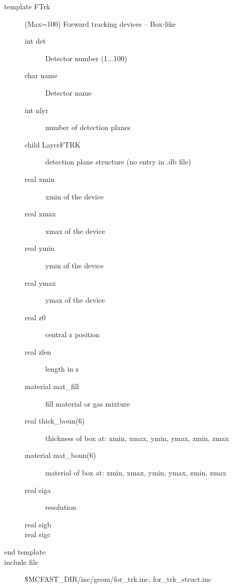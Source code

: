 \begin{description}
\item[{\rm template} FTrk](Max=100)   Forward tracking devices  -- Box-like
\begin{description}
\item[{\rm  int} det]    Detector number (1...100)
\item[{\rm  char} name]  Detector name
\item[{\rm  int} nlyr]   number of detection planes 
\item[{\rm  child} LayerFTRK]  detection plane structure  (no entry in .db file)
\item[{\rm  real} xmin]  xmin of the device
\item[{\rm  real} xmax]  xmax of the device
\item[{\rm  real} ymin]  ymin of the device
\item[{\rm  real} ymax]  ymax of the device
\item[{\rm  real} z0]    central z position
\item[{\rm  real} zlen]  length in z
\item[{\rm  material} mat\_fill]  fill material or gas mixture
\item[{\rm  real} thick\_boun(6)]   thickness of box at: xmin, xmax, ymin, ymax, zmin, zmax
\item[{\rm  material} mat\_boun(6)] material of box at:  xmin, xmax, ymin, ymax, zmin, zmax
\item[{\rm  real} siga] resolution
\item[{\rm  real} sigb]
\item[{\rm  real} sigc]  
\end{description}
\item[end template]
\item[include file] \$MCFAST\_DIR/inc/geom/for\_trk.inc, for\_trk\_struct.inc
\end{description}


